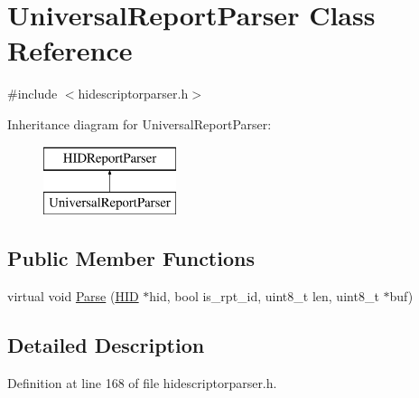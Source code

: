 \hypertarget{class_universal_report_parser}{\section{\-Universal\-Report\-Parser \-Class \-Reference}
\label{class_universal_report_parser}
}


{\ttfamily \#include $<$hidescriptorparser.\-h$>$}

\-Inheritance diagram for \-Universal\-Report\-Parser\-:\begin{figure}[H]
\begin{center}
\leavevmode
\includegraphics[height=2.000000cm]{class_universal_report_parser}
\end{center}
\end{figure}
\subsection*{\-Public \-Member \-Functions}
\begin{DoxyCompactItemize}
\item 
virtual void \hyperlink{class_universal_report_parser_a7b88d36949e3823cd80b3c7cece3d67e}{\-Parse} (\hyperlink{class_h_i_d}{\-H\-I\-D} $\ast$hid, bool is\-\_\-rpt\-\_\-id, uint8\-\_\-t len, uint8\-\_\-t $\ast$buf)
\end{DoxyCompactItemize}


\subsection{\-Detailed \-Description}


\-Definition at line 168 of file hidescriptorparser.\-h.



